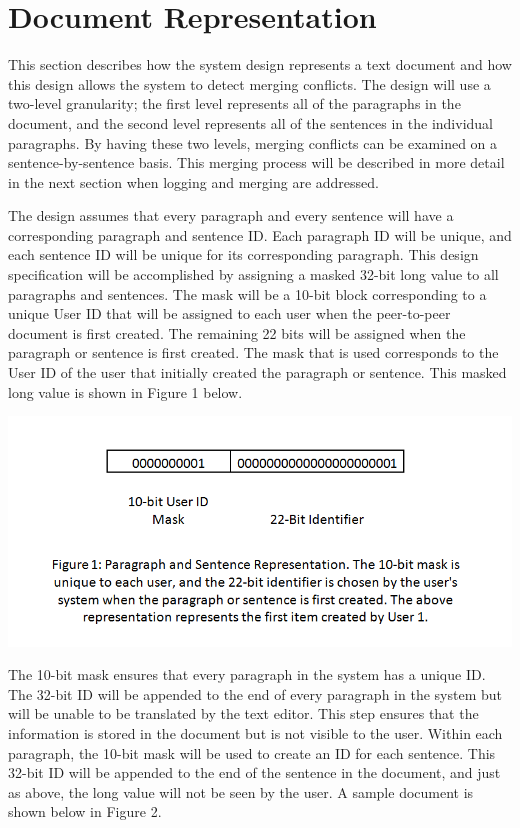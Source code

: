 \section{Document Representation}
This section describes how the system design represents a text document and how this design allows the system to detect merging conflicts. The design will use a two-level granularity; the first level represents all of the paragraphs in the document, and the second level represents all of the sentences in the individual paragraphs. By having these two levels, merging conflicts can be examined on a sentence-by-sentence basis. This merging process will be described in more detail in the next section when logging and merging are addressed.

The design assumes that every paragraph and every sentence will have a corresponding paragraph and sentence ID. Each paragraph ID will be unique, and each sentence ID will be unique for its corresponding paragraph. This design specification will be accomplished by assigning a masked 32-bit long value to all paragraphs and sentences. The mask will be a 10-bit block corresponding to a unique User ID that will be assigned to each user when the peer-to-peer document is first created. The remaining 22 bits will be assigned when the paragraph or sentence is first created. The mask that is used corresponds to the User ID of the user that initially created the paragraph or sentence.  This masked long value is shown in Figure 1 below.

\includegraphics[scale=0.55]{figure1.png}

The 10-bit mask ensures that every paragraph in the system has a unique ID. The 32-bit ID will be appended to the end of every paragraph in the system but will be unable to be translated by the text editor. This step ensures that the information is stored in the document but is not visible to the user. Within each paragraph, the 10-bit mask will be used to create an ID for each sentence. This 32-bit ID will be appended to the end of the sentence in the document, and just as above, the long value will not be seen by the user. A sample document is shown below in Figure 2.

